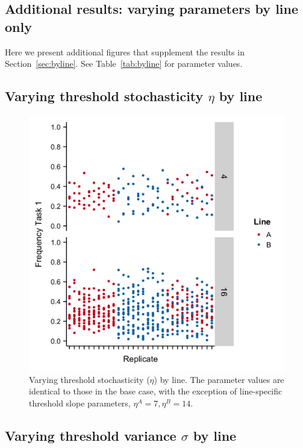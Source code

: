 \documentclass[11pt]{article}
\begin{document}
\begin{appendices}


\section{Additional results: varying parameters by line only}\vspace{-5pt}
Here we present additional figures that supplement the results in Section~\ref{sec:byline}. See Table~\ref{tab:byline} for parameter values.\vspace{-5pt}

\subsection{Varying threshold stochasticity \texorpdfstring{$\eta$ by }\ line}\vspace{-5pt}

\begin{figure}[H]
	\centering
	\includegraphics[width=.4\linewidth]{output/Task_dist/plots_before_190120/Diff_Etas_HighB.png}
	\caption{Varying threshold stochasticity ($\eta$) by line. The parameter values are identical to those in the base case, with the exception of line-specific threshold slope parameters, $\eta^A = 7, \eta^B = 14$.
	\vspace{-5pt}} 
	\label{fig:varyetaAB}
\end{figure}

\subsection{Varying threshold variance \texorpdfstring{$\sigma$ by }\ line}\vspace{-5pt}


\end{appendices}
\end{document}
